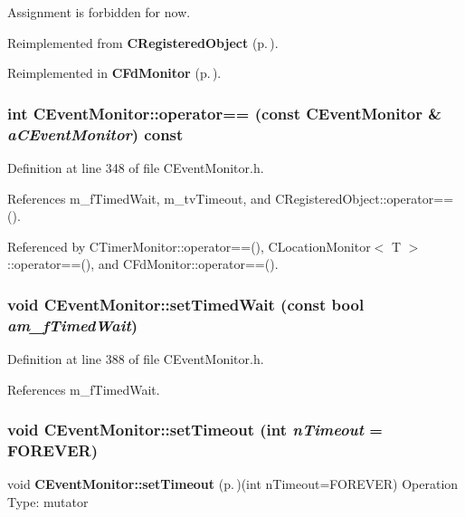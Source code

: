 Assignment is forbidden for now.



Reimplemented from {\bf CRegistered\-Object} {\rm (p.\,\pageref{classCRegisteredObject_c1})}.

Reimplemented in {\bf CFd\-Monitor} {\rm (p.\,\pageref{classCFdMonitor_c1})}.
\subsubsection{\setlength{\rightskip}{0pt plus 5cm}int CEvent\-Monitor::operator== (const CEvent\-Monitor \& {\em a\-CEvent\-Monitor}) const\hspace{0.3cm}{\tt  [inline]}}\label{classCEventMonitor_a3}




Definition at line 348 of file CEvent\-Monitor.h.

References m\_\-f\-Timed\-Wait, m\_\-tv\-Timeout, and CRegistered\-Object::operator==().

Referenced by CTimer\-Monitor::operator==(), CLocation\-Monitor$<$ T $>$::operator==(), and CFd\-Monitor::operator==().
\subsubsection{\setlength{\rightskip}{0pt plus 5cm}void CEvent\-Monitor::set\-Timed\-Wait (const bool {\em am\_\-f\-Timed\-Wait})\hspace{0.3cm}{\tt  [inline, protected]}}\label{classCEventMonitor_b1}




Definition at line 388 of file CEvent\-Monitor.h.

References m\_\-f\-Timed\-Wait.
\subsubsection{\setlength{\rightskip}{0pt plus 5cm}void CEvent\-Monitor::set\-Timeout (int {\em n\-Timeout} = {\bf FOREVER})\hspace{0.3cm}{\tt  [virtual]}}\label{classCEventMonitor_a8}


void {\bf CEvent\-Monitor::set\-Timeout} {\rm (p.\,\pageref{classCEventMonitor_b0})}(int n\-Timeout=FOREVER)  Operation Type: mutator

